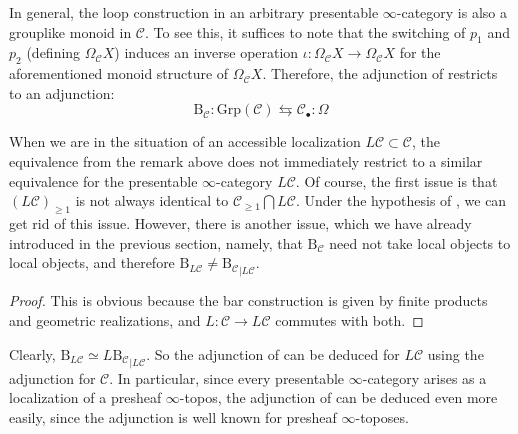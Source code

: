In general, the loop construction in an arbitrary presentable $\infty$-category is also a grouplike monoid in $\mathcal{C}$. To see this, it suffices to note that the switching of $p_1$ and $p_2$ (defining $\Omega_\mathcal{C}X$) induces an inverse operation $\iota : \Omega_{\mathcal{C}}X\to \Omega_{\mathcal{C}}X$ for the aforementioned monoid structure of $\Omega_{\mathcal{C}}X$. Therefore, the adjunction of  restricts to an adjunction:
$$\mathrm{B}_{\mathcal{C}}: \mathrm{Grp}(\mathcal{C}) \leftrightarrows \mathcal{C}_\bullet:\Omega$$
When we are in the situation of an accessible localization $L\mathcal{C}\subset \mathcal{C}$, the equivalence from the remark above does not immediately restrict to a similar equivalence for the presentable $\infty$-category $L\mathcal{C}$. Of course, the first issue is that $(L\mathcal{C})_{\geq 1}$ is not always identical to $\mathcal{C}_{\geq 1}\bigcap L\mathcal{C}$. Under the hypothesis of , we can get rid of this issue. However, there is another issue, which we have already introduced in the previous section, namely, that $\mathrm{B}_{\mathcal{C}}$ need not take local objects to local objects, and therefore $\mathrm{B}_{L\mathcal{C}}\neq {\mathrm{B}_\mathcal{C}}_{|L\mathcal{C}}$.  
\begin{proof}
    This is obvious because the bar construction is given by finite products and geometric realizations, and $L:\mathcal{C}\to L\mathcal{C}$ commutes with both. 
\end{proof}
\begin{rem}
Clearly, $\mathrm{B}_{L\mathcal{C}}\simeq {L\mathrm{B}_\mathcal{C}}_{|L\mathcal{C}}$. So the adjunction of  can be deduced for $L\mathcal{C}$ using the adjunction for $\mathcal{C}$. In particular, since every presentable $\infty$-category arises as a localization of a presheaf $\infty$-topos, the adjunction of  can be deduced even more easily, since the adjunction is well known for presheaf $\infty$-toposes. 
\end{rem}
